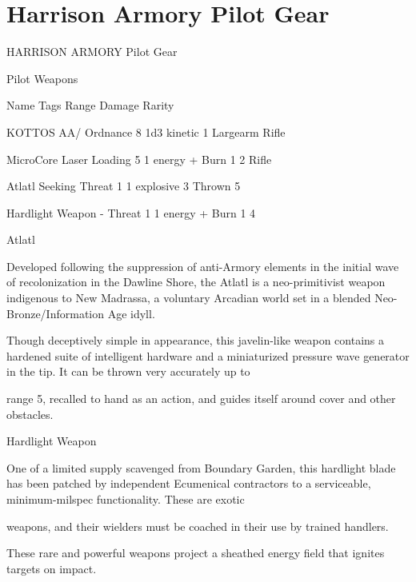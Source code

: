 \section{Harrison Armory Pilot Gear}

                                  HARRISON ARMORY Pilot Gear

                                                    Pilot Weapons

  Name                    Tags                                      Range            Damage                  Rarity

 KOTTOS AA/               Ordnance                                  8                1d3 kinetic             1
 Largearm Rifle

 MicroCore Laser          Loading                                  5                 1 energy + Burn 1       2
 Rifle

 Atlatl                   Seeking                                  Threat 1
         1 explosive             3
                                                                   Thrown 5

 Hardlight Weapon         -                                        Threat 1          1 energy + Burn 1       4

Atlatl

Developed following the suppression of anti-Armory elements in the initial wave of recolonization in the
Dawline Shore, the Atlatl is a neo-primitivist weapon indigenous to New Madrassa, a voluntary Arcadian
world set in a blended Neo-Bronze/Information Age idyll.

Though deceptively simple in appearance, this javelin-like weapon contains a hardened suite of intelligent
hardware and a miniaturized pressure wave generator in the tip. It can be thrown very accurately up to

range 5, recalled to hand as an action, and guides itself around cover and other obstacles.


Hardlight Weapon

One of a limited supply scavenged from Boundary Garden, this hardlight blade has been patched by
independent Ecumenical contractors to a serviceable, minimum-milspec functionality. These are exotic

weapons, and their wielders must be coached in their use by trained handlers.

These rare and powerful weapons project a sheathed energy field that ignites targets on impact.



